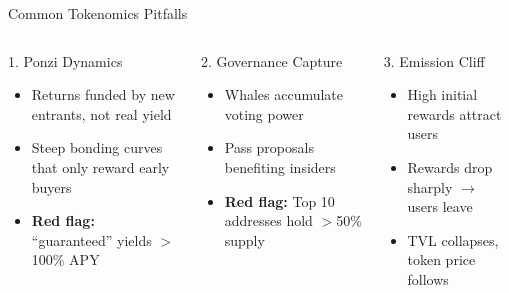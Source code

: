 \documentclass[8pt,aspectratio=169]{beamer}
\begin{document}
\begin{frame}{Common Tokenomics Pitfalls}
\begin{columns}[T]
\begin{alertblock}{\footnotesize 1. Ponzi Dynamics}
\footnotesize
\begin{itemize}
  \item Returns funded by new entrants, not real yield
  \item Steep bonding curves that only reward early buyers
  \item \textbf{Red flag:} ``guaranteed'' yields $>$ 100\% APY
\end{itemize}
\end{alertblock}
\vspace{1mm}
\begin{alertblock}{\footnotesize 2. Governance Capture}
\footnotesize
\begin{itemize}
  \item Whales accumulate voting power
  \item Pass proposals benefiting insiders
  \item \textbf{Red flag:} Top 10 addresses hold $>$50\% supply
\end{itemize}
\end{alertblock}
\vspace{1mm}
\begin{alertblock}{\footnotesize 3. Emission Cliff}
\footnotesize
\begin{itemize}
  \item High initial rewards attract users
  \item Rewards drop sharply $\rightarrow$ users leave
  \item TVL collapses, token price follows
\end{itemize}
\end{alertblock}


\end{columns}
\end{frame}
\end{document}
